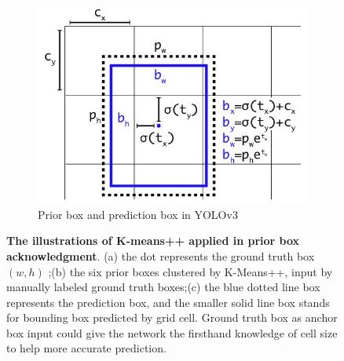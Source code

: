 \begin{figure}[h]
\begin{center}
\begin{subfigure}[b]{0.49\textwidth}
			\includegraphics[width=\textwidth]{thesis-template-master/images/anchor.JPG}
			\caption{ Prior box and prediction box in YOLOv3\cite{33}}
			
		\end{subfigure}
	\end{center}
	\caption{\textbf{The illustrations of K-means++ applied in prior box acknowledgment}. (a) the dot represents the ground truth box$(w,h)$ ;(b) the six prior boxes clustered by K-Means++,  input by manually labeled ground truth boxes;(c)  the blue dotted line box represents the prediction box, and the smaller solid line box stands for bounding box predicted by grid cell.  Ground truth box as anchor box input could give the network the firsthand knowledge of cell size to help more accurate prediction.}
	\label{fig:3.2}
\end{figure}

